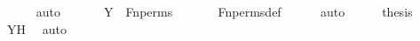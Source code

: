 \begin{isabellebody}
\ \ \ \ \isamarkupfalse%
\ auto\ \isanewline
\ \ \isamarkupfalse%
\ \isamarkupfalse%
\ {\isachardoublequoteopen}Y\ {\isacharequal}{\kern0pt}\ Fn{\isacharunderscore}{\kern0pt}perms{\isachardoublequoteclose}\ \isanewline
\ \ \ \ \isamarkupfalse%
\ Fn{\isacharunderscore}{\kern0pt}perms{\isacharunderscore}{\kern0pt}def\isanewline
\ \ \ \ \isamarkupfalse%
\ auto\isanewline
\ \ \isamarkupfalse%
\ \isamarkupfalse%
\ {\isacharquery}{\kern0pt}thesis\ \isamarkupfalse%
\ YH\ \isamarkupfalse%
\ auto\isanewline
{}\isamarkupfalse%
%
\endisatagproof
{\isafoldproof}%
%
\isadelimproof
\ \isanewline
%
\endisadelimproof
\isanewline
{}\isamarkupfalse%
\isanewline
%
\isadelimtheory
%
\endisadelimtheory
%
\isatagtheory
{}\isamarkupfalse%
%
\endisatagtheory
{\isafoldtheory}%
%
\isadelimtheory
%
\endisadelimtheory
%
\end{isabellebody}%
\endinput
